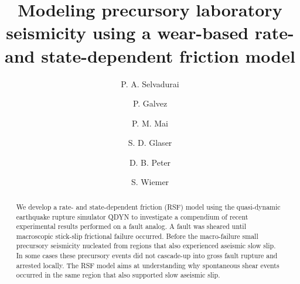 \documentclass[preprint,1p, 10pt,authoryear]{elsarticle}
\begin{document}
\begin{frontmatter}



\title{Modeling precursory laboratory seismicity using a wear-based rate- and state-dependent friction model}

 \author[1]{P. A. Selvadurai }
\author[2]{P. Galvez}
\author[2]{P. M. Mai}
\author[3]{S. D. Glaser} 
\author[2]{D. B. Peter}
\author[1]{S. Wiemer} 



\address[1]{Swiss Seismological Service, ETH Zurich, Zurich, Switzerland}
\address[2]{King Abdullah University of Science and Technology, Thuwal, Saudi Arabia}
\address[3]{Civil and Environmental Engineering, University of California, Berkeley, California, USA}



\begin{abstract}
We develop a rate- and state-dependent friction (RSF) model using the quasi-dynamic earthquake rupture simulator QDYN to investigate a compendium of recent experimental results performed on a fault analog. A fault was sheared until macroscopic stick-slip frictional failure occurred. Before the macro-failure small precursory seismicity nucleated from regions that also experienced aseismic slow slip. In some cases these precursory events did not cascade-up into gross fault rupture and arrested locally. The RSF model aims at understanding why spontaneous shear events occurred in the same region that also supported slow aseismic slip.  


\end{abstract}
\end{frontmatter}
\end{document}
